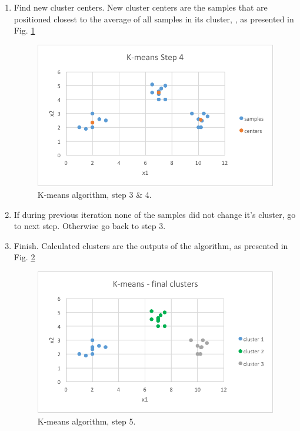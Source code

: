 \begin{enumerate}
	\item Find new cluster centers. New cluster centers are the samples that are positioned closest to the average of all samples in its cluster, , as presented in Fig. \ref{kmeans_s4}
	\begin{figure}[H]
	\begin{center}
	\includegraphics[width=0.8\linewidth]{images/kmeans4.png}
	\caption{K-means algorithm, step 3 \& 4.}
	\label{kmeans_s4}
	\end{center}
	\end{figure}
	
	\item If during previous iteration none of the samples did not change it's cluster, go to next step. Otherwise go back to step 3.
	
	\item Finish. Calculated clusters are the outputs of the algorithm, as presented in Fig. \ref{kmeans_s5}
	\begin{figure}[H]
	\begin{center}
	\includegraphics[width=0.8\linewidth]{images/kmeans5.png}
	\caption{K-means algorithm, step 5.}
	\label{kmeans_s5}
	\end{center}
	\end{figure}
	
	\end{enumerate}
	

